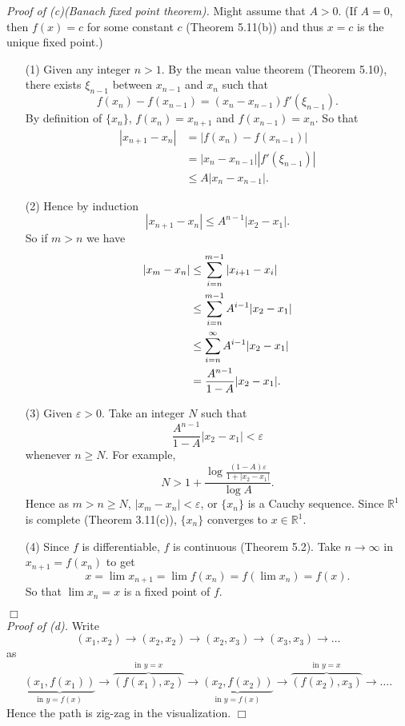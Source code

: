 \documentclass{article}
\begin{document}
\emph{Proof of (c)(Banach fixed point theorem).}
Might assume that $A > 0$.
(If $A = 0$, then $f(x) = c$ for some constant $c$ (Theorem 5.11(b))
and thus $x = c$ is the unique fixed point.)
\begin{enumerate}
\item[(1)]
Given any integer $n > 1$.
By the mean value theorem (Theorem 5.10),
there exists $\xi_{n-1}$ between $x_{n-1}$ and $x_{n}$ such that
\[
  f(x_{n}) - f(x_{n-1}) = (x_{n} - x_{n-1}) f'(\xi_{n-1}).
\]
By definition of $\{x_n\}$,
$f(x_{n}) = x_{n+1}$ and $f(x_{n-1}) = x_{n}$.
So that
\begin{align*}
  |x_{n+1} - x_{n}|
  &= |f(x_n) - f(x_{n-1})| \\
  &= |x_{n} - x_{n-1}||f'(\xi_{n-1})| \\
  &\leq A|x_{n} - x_{n-1}|.
\end{align*}

\item[(2)]
Hence by induction
\[
  |x_{n+1} - x_{n}| \leq A^{n-1}|x_2 - x_1|.
\]
So if $m > n$ we have
\begin{align*}
  |x_{m} - x_{n}|
  &\leq \sum_{i=n}^{m-1} \abs{x_{i+1} - x_{i}} \\
  &\leq \sum_{i=n}^{m-1} A^{i-1}|x_2 - x_1| \\
  &\leq \sum_{i=n}^{\infty} A^{i-1} |x_2 - x_1| \\
  &= \frac{A^{n-1}}{1-A} |x_2 - x_1|.
\end{align*}

\item[(3)]
Given $\varepsilon > 0$.
Take an integer $N$ such that
\[
  \frac{A^{n-1}}{1-A} |x_2 - x_1| < \varepsilon
\]
whenever $n \geq N$.
For example,
\[
  N > 1 + \frac{\log \frac{(1-A)\varepsilon}{1 + |x_2-x_1|}}{\log A}.
\]
Hence as $m > n \geq N$, $|x_{m} - x_{n}| < \varepsilon$,
or $\{x_n\}$ is a Cauchy sequence.
Since $\mathbb{R}^1$ is complete (Theorem 3.11(c)),
$\{x_n\}$ converges to $x \in \mathbb{R}^1$.

\item[(4)]
Since $f$ is differentiable, $f$ is continuous (Theorem 5.2).
Take $n \to \infty$ in $x_{n+1} = f(x_n)$
to get
\[
  x = \lim x_{n+1} = \lim f(x_n) = f(\lim x_n) = f(x).
\]
So that $\lim x_n = x$ is a fixed point of $f$.
\end{enumerate}
$\Box$ \\



\emph{Proof of (d).}
Write
\[
  (x_1,x_2) \to (x_2,x_2) \to (x_2,x_3) \to (x_3,x_3) \to \ldots
\]
as
\[
  \underbrace{(x_1,f(x_1))}_{\text{in }y = f(x)}
  \to
  \overbrace{(f(x_1),x_2)}^{\text{in }y = x}
  \to
  \underbrace{(x_2,f(x_2))}_{\text{in }y = f(x)}
  \to
  \overbrace{(f(x_2),x_3)}^{\text{in }y = x} \to \ldots.
\]
Hence the path is zig-zag in the visualization.
$\Box$ \\\\
\end{document}
